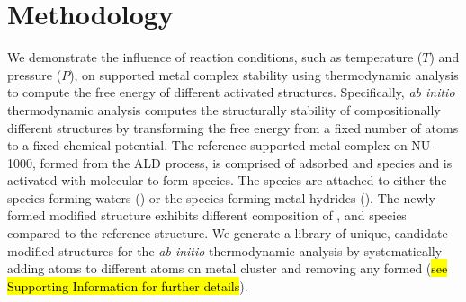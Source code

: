 \documentclass[journal=jctcce,manuscript=article]{achemso}
\begin{document}




\newpage
\section{Methodology}
We demonstrate the influence of reaction conditions, such as temperature ($T$) and pressure ($P$), on supported metal complex stability using thermodynamic analysis to compute the free energy of different activated structures. Specifically, \textit{ab initio} thermodynamic analysis computes the structurally stability of compositionally different structures by transforming the free energy from a fixed number of atoms to a fixed chemical potential. The reference supported metal complex on NU-1000, formed from the ALD process, is comprised of adsorbed  and  species and is activated with molecular  to form  species. The  species are attached to either the  species forming waters () or the  species forming metal hydrides (). The newly formed modified structure exhibits different composition of ,  and  species compared to the reference structure. We generate a library of unique, candidate modified structures for the \textit{ab initio} thermodynamic analysis by systematically adding  atoms to different atoms on metal cluster and removing any formed  (\hl{see Supporting Information for further details}).
\end{document}
